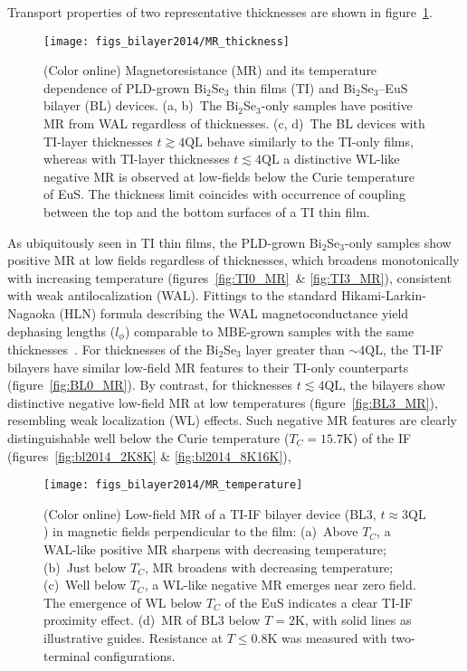 Transport properties of two representative thicknesses are shown in figure~\ref{fig:bl2014_MR_thickness}. %
%
\begin{figure}[h]%
\centering%
\subfloat{\label{fig:TI0_MR}}%
\subfloat{\label{fig:TI3_MR}}%
\subfloat{\label{fig:BL0_MR}}%
\subfloat{\label{fig:BL3_MR}}%
\texttt{[image: figs\_bilayer2014/MR\_thickness]}%
\caption[Magnetoresistance of PLD-grown Bi$_2$Se$_3$ thin films and Bi$_2$Se$_3$--EuS bilayers]{\label{fig:bl2014_MR_thickness}(Color online) Magnetoresistance (MR) and its temperature dependence of PLD-grown Bi$_2$Se$_3$ thin films (TI) and Bi$_2$Se$_3$--EuS bilayer (BL) devices. (a, b)~The Bi$_2$Se$_3$-only samples have positive MR from WAL regardless of thicknesses. (c, d)~The BL devices with TI-layer thicknesses $t\gtrsim4\mathrm{QL}$ behave similarly to the TI-only films, whereas with TI-layer thicknesses $t\lesssim4\mathrm{QL}$ a distinctive WL-like negative MR is observed at low-fields below the Curie temperature of EuS. The thickness limit coincides with occurrence of coupling between the top and the bottom surfaces of a TI thin film.}%
\end{figure}%
%
As ubiquitously seen in TI thin films, the PLD-grown Bi$_2$Se$_3$-only samples show positive MR at low fields regardless of thicknesses, which broadens monotonically with increasing temperature (figures~\ref{fig:TI0_MR}~\& \ref{fig:TI3_MR}), consistent with weak antilocalization (WAL). Fittings to the standard Hikami-Larkin-Nagaoka (HLN) formula describing the WAL magnetoconductance\cite{WL_HLN, WL_Khmel, bergmann1984} yield dephasing lengths ($l_\phi$) comparable to MBE-grown samples with the same thicknesses~\cite{TI_WAL_thickness, zhangli2013}. For thicknesses of the Bi$_2$Se$_3$ layer greater than $\sim4\mathrm{QL}$, the TI-IF bilayers have similar low-field MR features to their TI-only counterparts (figure~\ref{fig:BL0_MR}). By contrast, for thicknesses $t\lesssim4\mathrm{QL}$, the bilayers show distinctive negative low-field MR at low temperatures (figure~\ref{fig:BL3_MR}), resembling weak localization (WL) effects. Such negative MR features are clearly distinguishable well below the Curie temperature ($T_C=15.7$K) of the IF (figures~\ref{fig:bl2014_2K8K} \& \ref{fig:bl2014_8K16K}), %
%
%
\begin{figure}[h]%
\centering%
\subfloat{\label{fig:bl2014_16K30K}}%
\subfloat{\label{fig:bl2014_8K16K}}%
\subfloat{\label{fig:bl2014_2K8K}}%
\subfloat{\label{fig:bl2014_He3}}%
\texttt{[image: figs\_bilayer2014/MR\_temperature]}%
\caption[Magnetoresistance of Bi$_2$Se$_3$--EuS bilayer in different temperature r\'egimes]{\label{fig:bl2014_MR_temperature}(Color online) Low-field MR of a TI-IF bilayer device (BL3, $t\approx3\mathrm{QL}$) in magnetic fields perpendicular to the film: (a)~Above $T_C$, a WAL-like positive MR sharpens with decreasing temperature; (b)~Just below $T_C$, MR broadens with decreasing temperature; (c)~Well below $T_C$, a WL-like negative MR emerges near zero field. The emergence of WL below $T_C$ of the EuS indicates a clear TI-IF proximity effect. (d)~MR of BL3 below $T=2$K, with solid lines as illustrative guides. Resistance at $T\leq0.8\mathrm{K}$ was measured with two-terminal configurations.}
\end{figure}%
